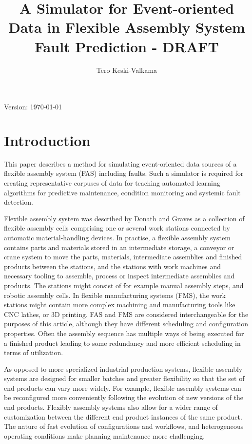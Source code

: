 \documentclass[journal]{IEEEtran}
\title{A Simulator for Event-oriented Data in Flexible Assembly System Fault Prediction - DRAFT}
\author{Tero Keski-Valkama}
\begin{document}
\maketitle
Version: \today

\begin{abstract}

\end{abstract}

\begin{IEEEkeywords}
\end{IEEEkeywords}

\section{Introduction}
This paper describes a method for simulating event-oriented data sources of a flexible assembly system (FAS) including faults. Such a simulator is required for creating representative corpuses
of data for teaching automated learning algorithms for predictive maintenance, condition monitoring and systemic fault detection.

Flexible assembly system was described by Donath and Graves \cite{donath1988flexible} as a collection of flexible assembly cells comprising one or several work stations connected by automatic material-handling devices.
In practise, a flexible assembly system contains parts and materials stored in an intermediate storage,
a conveyor or crane system to move the parts, materials, intermediate assemblies and finished products between the stations, and the stations with work machines and necessary tooling
to assemble, process or inspect intermediate assemblies and products. The stations might consist of for example manual assembly steps, and robotic assembly cells. In flexible manufacturing systems (FMS),
the work stations might contain more complex machining and manufacturing tools like CNC lathes, or 3D printing. FAS and FMS are considered interchangeable for the purposes of this article, although
they have different scheduling and configuration properties.
Often the assembly sequence has multiple ways of being executed for a finished product leading to some redundancy and more efficient scheduling in terms of utilization.

As opposed to more specialized industrial production systems, flexible assembly systems are designed for smaller batches and greater flexibility so that the set of end products can vary more widely.
For example, flexible assembly systems can be reconfigured more conveniently following the evolution of new versions of the end products. Flexibly assembly systems also allow for a wider range
of customization between the different end product instances of the same product. The nature of fast evolution of configurations and workflows, and heterogeneous operating conditions make
planning maintenance more challenging.
\end{document}
